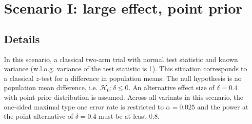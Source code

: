 \documentclass[]{book}
\newenvironment{Shaded}{\begin{snugshade}}{\end{snugshade}}
\newcommand{\CharTok}[1]{\textcolor[rgb]{0.31,0.60,0.02}{#1}}
\newcommand{\CommentTok}[1]{\textcolor[rgb]{0.56,0.35,0.01}{\textit{#1}}}
\newcommand{\ControlFlowTok}[1]{\textcolor[rgb]{0.13,0.29,0.53}{\textbf{#1}}}
\newcommand{\DataTypeTok}[1]{\textcolor[rgb]{0.13,0.29,0.53}{#1}}
\newcommand{\DecValTok}[1]{\textcolor[rgb]{0.00,0.00,0.81}{#1}}
\newcommand{\FloatTok}[1]{\textcolor[rgb]{0.00,0.00,0.81}{#1}}
\newcommand{\KeywordTok}[1]{\textcolor[rgb]{0.13,0.29,0.53}{\textbf{#1}}}
\newcommand{\NormalTok}[1]{#1}
\newcommand{\StringTok}[1]{\textcolor[rgb]{0.31,0.60,0.02}{#1}}
\begin{document}
\begin{Shaded}
\end{Shaded}

\hypertarget{scenarioI}{%
\chapter{Scenario I: large effect, point prior}\label{scenarioI}}

\hypertarget{details}{%
\section{Details}\label{details}}

In this scenario, a classical two-arm trial with normal
test statistic and known variance (w.l.o.g. variance of
the test statistic is 1).
This situation corresponds to a classical \(z\)-test for
a difference in population means.
The null hypothesis is no population mean difference, i.e.
\(\mathcal{H}_0:\delta \leq 0\).
An alternative effect size of \(\delta = 0.4\) with
point prior distribution is assumed.
Across all variants in this scenario, the one-sided maximal
type one error rate is restricted to \(\alpha=0.025\)
and the power at the point alternative of \(\delta=0.4\) must
be at least \(0.8\).
\end{document}
